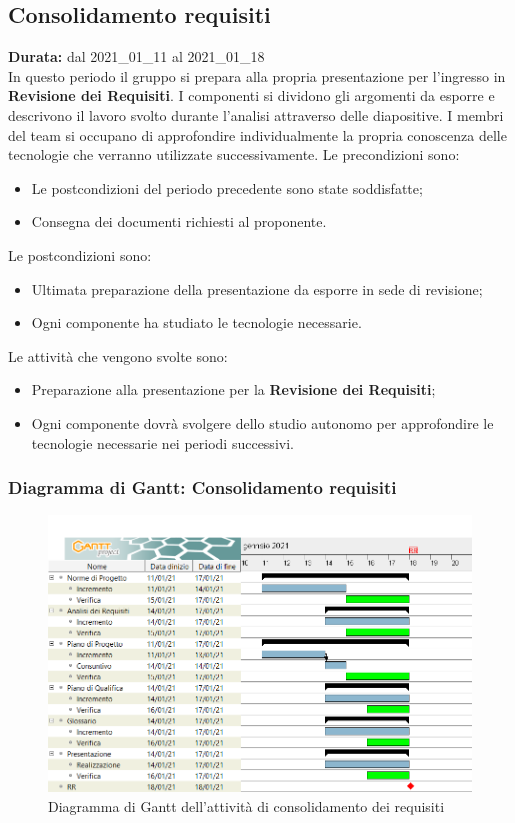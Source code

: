 \subsection{Consolidamento requisiti}
\label{consolidamento_requisiti}
\textbf{Durata:} dal 2021\_01\_11 al 2021\_01\_18\\
In questo periodo il gruppo si prepara alla propria presentazione per l'ingresso in \textbf{Revisione dei Requisiti}.
I componenti si dividono gli argomenti da esporre e descrivono il lavoro svolto durante l'analisi attraverso delle diapositive.
I membri del team si occupano di approfondire individualmente la propria conoscenza delle tecnologie che verranno utilizzate successivamente.
Le precondizioni sono:
\begin{itemize}
    \item Le postcondizioni del periodo precedente sono state soddisfatte;
    \item Consegna dei documenti richiesti al proponente.
\end{itemize}
Le postcondizioni sono:
\begin{itemize}
    \item Ultimata preparazione della presentazione da esporre in sede di revisione;
    \item Ogni componente ha studiato le tecnologie necessarie.
\end{itemize}
Le attività che vengono svolte sono:
\begin{itemize}
    \item Preparazione alla presentazione per la \textbf{Revisione dei Requisiti};
    \item Ogni componente dovrà svolgere dello studio autonomo per approfondire le tecnologie necessarie nei periodi successivi.  
\end{itemize}
\newpage
\subsubsection{Diagramma di Gantt: Consolidamento requisiti}
\begin{figure}[ht]
    \centering
    \includegraphics[width=\textwidth]{Immagini/GanttConsolidamentoRequisiti}
    \caption{Diagramma di Gantt dell'attività di consolidamento dei requisiti}
\end{figure}